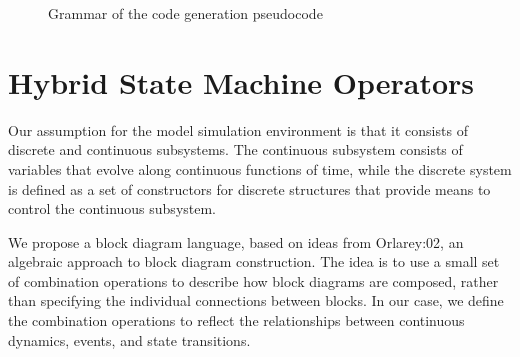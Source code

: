 \documentclass[a4paper]{article}
\begin{document}
\begin{figure}
{
}
\caption{\label{Fig:PseudocodeSyntax}Grammar of the code generation pseudocode}\end{figure}

\section{Hybrid State Machine Operators}
\label{sec:hsm}


Our assumption for the model simulation environment is that it
consists of discrete and continuous subsystems. The continuous
subsystem consists of variables that evolve along continuous functions
of time, while the discrete system is defined as a set of constructors
for discrete structures that provide means to control the continuous
subsystem. 

We propose a block diagram language, based on ideas from
Orlarey:02, an algebraic approach to block diagram
construction. The idea is to use a small set of combination operations
to describe how block diagrams are composed, rather than specifying
the individual connections between blocks. In our case, we define the
combination operations to reflect the relationships between continuous
dynamics, events, and state transitions.
\end{document}
